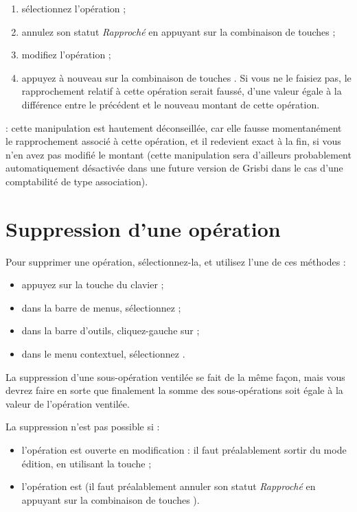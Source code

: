\begin{enumerate}
	 \item sélectionnez l'opération ;
	 \item annulez son statut \emph{Rapproché} en appuyant sur la combinaison de touches   ;
	 \item modifiez l'opération ;
	 \item appuyez à nouveau sur la combinaison de touches  . Si vous ne le faisiez pas, le rapprochement relatif à cette opération serait faussé, d'une valeur égale à la différence entre le précédent et le nouveau montant de cette opération.
\end{enumerate}

 : cette manipulation est hautement déconseillée, car elle fausse momentanément le rapprochement associé à cette opération, et il redevient exact à la fin, si vous n'en avez pas modifié le montant (cette manipulation sera d'ailleurs probablement automatiquement désactivée dans une future version de Grisbi dans le cas d'une comptabilité de type association).


\section{Suppression d'une opération\label{transactions-delete}}


Pour supprimer une opération, sélectionnez-la, et utilisez l'une de ces
méthodes :
\begin{itemize}
	 \item appuyez sur la touche du clavier  ;
	 \item dans la barre de menus, sélectionnez  ;
	 \item dans la barre d'outils, cliquez-gauche sur  ;
	 \item dans le menu contextuel, sélectionnez .
\end{itemize}

La suppression d'une sous-opération ventilée se fait de la même façon, mais vous devrez faire en sorte que finalement la somme des sous-opérations soit égale à la valeur de l'opération ventilée.

\ifIllustration
\fi

La suppression n'est pas possible si :

\begin{itemize}
	 \item l'opération est ouverte en modification : il faut préalablement sortir du mode édition, en utilisant la touche  ;
	 \item l'opération est  (il faut préalablement annuler son statut \emph{Rapproché} en appuyant sur la combinaison de touches  ).
\end{itemize}

